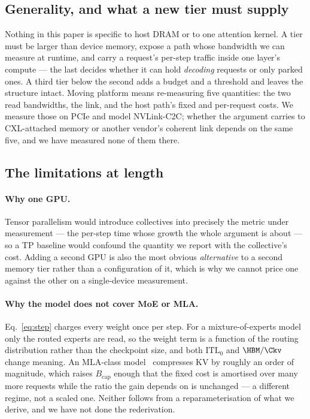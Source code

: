 \subsection*{Generality, and what a new tier must supply}
\label{sec:discussion:general}

Nothing in this paper is specific to host DRAM or to one attention kernel. A tier
must be larger than device memory, expose a path whose bandwidth we can measure at
runtime, and carry a request's per-step traffic inside one layer's compute --- the
last decides whether it can hold \emph{decoding} requests or only parked ones. A
third tier below the second adds a budget and a threshold and leaves the structure
intact. Moving platform means re-measuring five quantities: the two read bandwidths,
the link, and the host path's fixed and per-request costs. We measure those on PCIe
and model NVLink-C2C; whether the argument carries to CXL-attached memory or another
vendor's coherent link depends on the same five, and we have measured none of them
there.

\subsection*{The limitations at length}

\paragraph{Why one GPU.} Tensor parallelism would introduce collectives into
precisely the metric under measurement --- the per-step time whose growth the whole
argument is about --- so a TP baseline would confound the quantity we report with
the collective's cost. Adding a second GPU is also the most obvious
\emph{alternative} to a second memory tier rather than a configuration of it, which
is why we cannot price one against the other on a single-device measurement.

\paragraph{Why the model does not cover MoE or MLA.} Eq.~\ref{eq:step} charges every
weight once per step. For a mixture-of-experts model only the routed experts are
read, so the weight term is a function of the routing distribution rather than the
checkpoint size, and both $\mathrm{ITL}_0$ and $\HBM/\Ckv$ change meaning. An
MLA-class model~\cite{deepseekv2} compresses KV by roughly an order of magnitude,
which raises $B_{\mathrm{cap}}$ enough that the fixed cost is amortised over many
more requests while the ratio the gain depends on is unchanged --- a different
regime, not a scaled one. Neither follows from a reparameterisation of what we
derive, and we have not done the rederivation.

